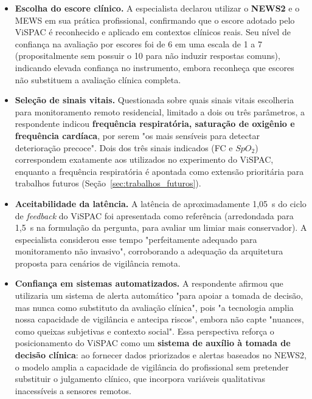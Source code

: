 \documentclass[twoside,english,brazilian]{UNISINOSmonografia}
\begin{document}
\begin{itemize}

\item \textbf{Escolha do escore clínico.} A especialista declarou utilizar o \textbf{NEWS2} e o MEWS em sua prática profissional, confirmando que o escore adotado pelo ViSPAC é reconhecido e aplicado em contextos clínicos reais. Seu nível de confiança na avaliação por escores foi de 6 em uma escala de 1 a 7 (propositalmente sem possuir o 10 para não induzir respostas comuns), indicando elevada confiança no instrumento, embora reconheça que escores não substituem a avaliação clínica completa.

\item \textbf{Seleção de sinais vitais.} Questionada sobre quais sinais vitais escolheria para monitoramento remoto residencial, limitado a dois ou três parâmetros, a respondente indicou \textbf{frequência respiratória, saturação de oxigênio e frequência cardíaca}, por serem "os mais sensíveis para detectar deterioração precoce". Dois dos três sinais indicados (FC e $SpO_2$) correspondem exatamente aos utilizados no experimento do ViSPAC, enquanto a frequência respiratória é apontada como extensão prioritária para trabalhos futuros (Seção~\ref{sec:trabalhos_futuros}).

\item \textbf{Aceitabilidade da latência.} A latência de aproximadamente 1,05~s do ciclo de \textit{feedback} do ViSPAC foi apresentada como referência (arredondada para 1,5~s na formulação da pergunta, para avaliar um limiar mais conservador). A especialista considerou esse tempo "perfeitamente adequado para monitoramento não invasivo", corroborando a adequação da arquitetura proposta para cenários de vigilância remota.

\item \textbf{Confiança em sistemas automatizados.} A respondente afirmou que utilizaria um sistema de alerta automático "para apoiar a tomada de decisão, mas nunca como substituto da avaliação clínica", pois "a tecnologia amplia nossa capacidade de vigilância e antecipa riscos", embora não capte "nuances, como queixas subjetivas e contexto social". Essa perspectiva reforça o posicionamento do ViSPAC como um \textbf{sistema de auxílio à tomada de decisão clínica}: ao fornecer dados priorizados e alertas baseados no NEWS2, o modelo amplia a capacidade de vigilância do profissional sem pretender substituir o julgamento clínico, que incorpora variáveis qualitativas inacessíveis a sensores remotos.


\end{itemize}
\end{document}
